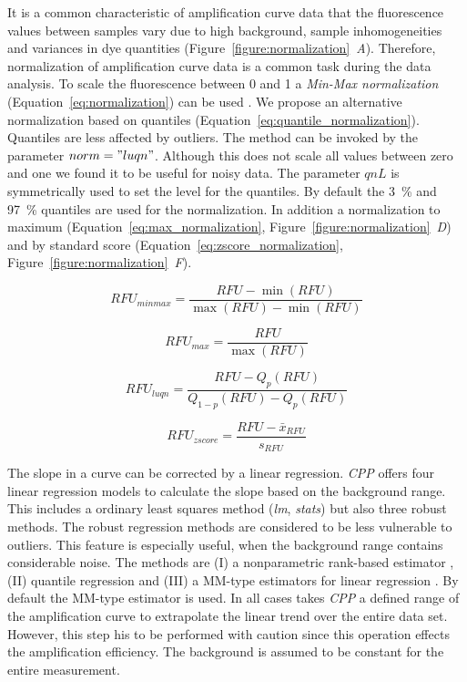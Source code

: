 \documentclass[twocolumn]{bmcart}%
\begin{document}
It is a common characteristic of amplification curve data that the fluorescence 
values between samples vary due to high background, sample inhomogeneities and 
variances in dye quantities (Figure~\ref{figure:normalization}~\emph{A}). 
Therefore, normalization of amplification curve data is a common task during the 
data analysis. To scale the fluorescence between 0 and 1 a \emph{Min-Max 
normalization} (Equation~\ref{eq:normalization}) can be used 
\cite{roediger_RJ_2013}. We propose an alternative normalization based on 
quantiles (Equation~\ref{eq:quantile_normalization}). Quantiles are less 
affected by outliers. The method can be invoked by the parameter $norm = 
"luqn"$. Although this does not scale all values between zero and one we found 
it to be useful for noisy data. The parameter $qnL$ is symmetrically used to set 
the level for the quantiles. By default the 3~\% and 97~\% quantiles are used 
for the normalization. In addition a normalization to maximum 
(Equation~\ref{eq:max_normalization}, 
Figure~\ref{figure:normalization}~\emph{D}) and by standard score 
(Equation~\ref{eq:zscore_normalization}, 
Figure~\ref{figure:normalization}~\emph{F}).

\begin{equation} \label{eq:normalization}
RFU_{minmax} = \frac{RFU - \min(RFU)}{\max(RFU) - \min(RFU)}
\end{equation}

\begin{equation} \label{eq:max_normalization}
RFU_{max} = \frac{RFU}{\max(RFU)}
\end{equation}

\begin{equation} \label{eq:quantile_normalization}
RFU_{luqn} = \frac{RFU - Q_{p}(RFU)}{Q_{1 - p}(RFU) - 
Q_{p}(RFU)}
\end{equation}

\begin{equation} \label{eq:zscore_normalization}
RFU_{zscore} = \frac{RFU - \bar{x}_{RFU}}{s_{RFU}}
\end{equation}

  The slope in a curve can be corrected by a linear regression. \textsl{CPP} 
offers four linear regression models to calculate the slope based on the 
background range. This includes a ordinary least squares method (\textsl{lm}, 
\emph{stats}) but also three robust methods. The robust regression methods are 
considered to be less vulnerable to outliers. This feature is especially useful, 
when the background range contains considerable noise. The methods are (I) a 
nonparametric rank-based estimator \cite{Kloke_2012}, (II) quantile regression 
\cite{Koenker_2008} and (III) a MM-type estimators for linear regression 
\cite{Todorov_2009}. By default the MM-type estimator is used. In all cases 
takes \textsl{CPP} a defined range of the amplification curve to extrapolate the 
linear trend over the entire data set. However, this step his to be performed 
with caution since this operation effects the amplification efficiency. The 
background is assumed to be constant for the entire measurement. 
\end{document}
